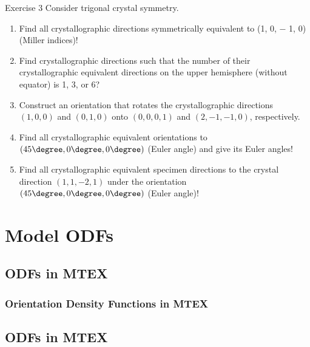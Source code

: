 \documentclass{beamer}
\newcommand{\MTEX}{{\bf {\color{red}M}TEX\,}}%
\begin{document}
\begin{frame}
  
  \begin{block}{Exercise 3}
 Consider trigonal crystal symmetry.

 \begin{enumerate}
 \item Find all crystallographic directions symmetrically equivalent to (1, 0,
   − 1, 0) (Miller indices)!
 \item Find crystallographic directions such that the number of their
   crystallographic equivalent directions on the upper hemisphere (without
   equator) is 1, 3, or 6?
 \item Construct an orientation that rotates the crystallographic directions
   $(1,0,0)$ and $(0,1,0)$ onto $(0,0,0,1)$ and $(2,-1,-1,0)$, respectively.
 \item Find all crystallographic equivalent orientations to
   $(45\degree,0\degree,0\degree)$ (Euler angle) and give its Euler angles!
 \item Find all crystallographic equivalent specimen directions to the crystal
   direction $(1,1,-2,1)$ under the orientation
   $(45\degree,0\degree,0\degree)$ (Euler angle)!
 \end{enumerate}

\end{block}




\end{frame}

\section{Model ODFs}


\subsection*{ODFs in MTEX}


\begin{frame}[fragile]
  \frametitle{Orientation Density Functions in \MTEX}



\end{frame}

\subsection*{ODFs in MTEX}
\end{document}
